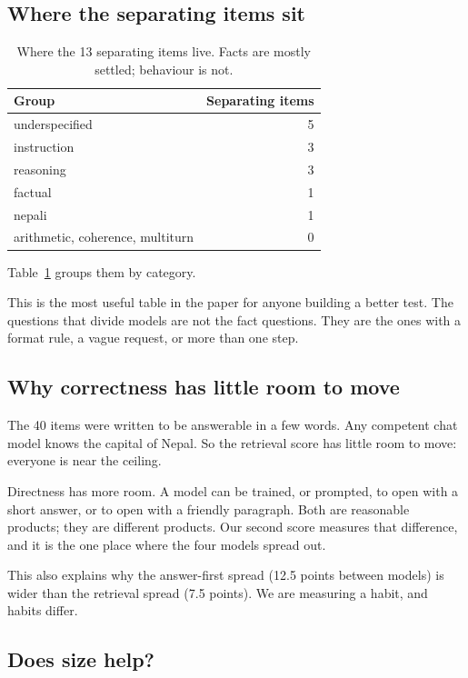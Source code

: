\documentclass[11pt,a4paper]{article}
\begin{document}
\subsection{Where the separating items sit}

\begin{table}[htbp]
\centering
\caption{Where the 13 separating items live. Facts are mostly settled; behaviour is not.}
\label{tab:separating}
\begin{tabular}{@{}lr@{}}
\toprule
Group & Separating items \\
\midrule
underspecified & 5 \\
instruction & 3 \\
reasoning & 3 \\
factual & 1 \\
nepali & 1 \\
arithmetic, coherence, multiturn & 0 \\
\bottomrule
\end{tabular}
\end{table}

Table~\ref{tab:separating} groups them by category.

This is the most useful table in the paper for anyone building a better test. The questions that divide models are not the fact questions. They are the ones with a format rule, a vague request, or more than one step.

\subsection{Why correctness has little room to move}

The 40 items were written to be answerable in a few words. Any competent chat model knows the capital of Nepal. So the retrieval score has little room to move: everyone is near the ceiling.

Directness has more room. A model can be trained, or prompted, to open with a short answer, or to open with a friendly paragraph. Both are reasonable products; they are different products. Our second score measures that difference, and it is the one place where the four models spread out.

This also explains why the answer-first spread (12.5 points between models) is wider than the retrieval spread (7.5 points). We are measuring a habit, and habits differ.

\subsection{Does size help?}
\end{document}
